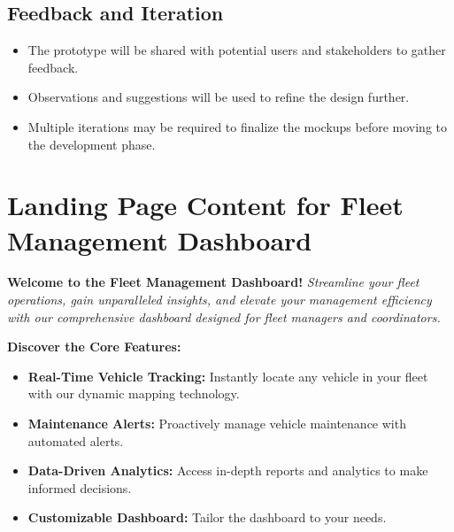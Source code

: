 \subsection*{Feedback and Iteration}
\begin{itemize}
    \item The prototype will be shared with potential users and stakeholders to gather feedback.
    \item Observations and suggestions will be used to refine the design further.
    \item Multiple iterations may be required to finalize the mockups before moving to the development phase.
\end{itemize}

\section*{Landing Page Content for Fleet Management Dashboard}

\textbf{Welcome to the Fleet Management Dashboard!}
\textit{Streamline your fleet operations, gain unparalleled insights, and elevate your management efficiency with our comprehensive dashboard designed for fleet managers and coordinators.}

\textbf{Discover the Core Features:}
\begin{itemize}
    \item \textbf{Real-Time Vehicle Tracking:} Instantly locate any vehicle in your fleet with our dynamic mapping technology.
    \item \textbf{Maintenance Alerts:} Proactively manage vehicle maintenance with automated alerts.
    \item \textbf{Data-Driven Analytics:} Access in-depth reports and analytics to make informed decisions.
    \item \textbf{Customizable Dashboard:} Tailor the dashboard to your needs.
\end{itemize}
